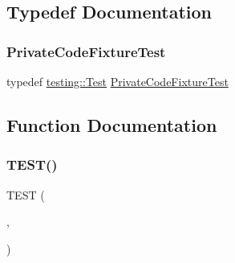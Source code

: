\subsection{Typedef Documentation}
\mbox{\label{_obj__test_2lib_2googletest-release-1_88_81_2googletest_2test_2gtest__prod__test_8cc_a89debba10c803e339ce0f9b0b34a2267}} 
\subsubsection{\texorpdfstring{PrivateCodeFixtureTest}{PrivateCodeFixtureTest}}
{\footnotesize\ttfamily typedef \mbox{\hyperlink{classtesting_1_1_test}{testing\+::\+Test}} \mbox{\hyperlink{googletest-master_2googletest_2test_2gtest__prod__test_8cc_a89debba10c803e339ce0f9b0b34a2267}{Private\+Code\+Fixture\+Test}}}



\subsection{Function Documentation}
\mbox{\label{_obj__test_2lib_2googletest-release-1_88_81_2googletest_2test_2gtest__prod__test_8cc_a8e307a199011c2979d4a63464d245f4a}} 
\subsubsection{\texorpdfstring{TEST()}{TEST()}}
{\footnotesize\ttfamily T\+E\+ST (\begin{DoxyParamCaption}\item[{Private\+Code\+Test}]{,  }\item[{Can\+Access\+Private\+Members}]{ }\end{DoxyParamCaption})}

\mbox{\label{_obj__test_2lib_2googletest-release-1_88_81_2googletest_2test_2gtest__prod__test_8cc_a5e21e7e8dd53f2de05e9e6941b6612d3}} 
